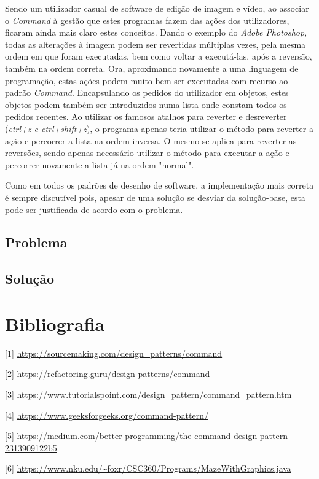 \documentclass[10pt,portuguese]{article}
\begin{document}
\par Sendo um utilizador casual de software de edição de imagem e vídeo, ao associar o \textit{Command} à gestão que estes programas fazem das ações dos utilizadores, ficaram ainda mais claro estes conceitos. Dando o exemplo do \textit{Adobe Photoshop}, todas as alterações à imagem podem ser revertidas múltiplas vezes, pela mesma ordem em que foram executadas, bem como voltar a executá-las, após a reversão, também na ordem correta. 
Ora, aproximando novamente a uma linguagem de programação, estas ações podem muito bem ser executadas com recurso ao padrão \textit{Command}. Encapsulando os pedidos do utilizador em objetos, estes objetos podem também ser introduzidos numa lista onde constam todos os pedidos recentes. 
Ao utilizar os famosos atalhos para reverter e desreverter (\textit{ctrl+z e ctrl+shift+z}), o programa apenas teria utilizar o método para reverter a ação e percorrer a lista na ordem inversa. O mesmo se aplica para reverter as reversões, sendo apenas necessário utilizar o método para executar a ação e percorrer novamente a lista já na ordem "normal".





\par Como em todos os padrões de desenho de software, a implementação mais correta é sempre discutível pois, apesar de uma solução se desviar da solução-base, esta pode ser justificada de acordo com o problema.

\subsection{Problema}
\subsection{Solução}


\clearpage

\section{Bibliografia}





\vspace{5mm} %

[1] \url{https://sourcemaking.com/design_patterns/command}

[2] \url{https://refactoring.guru/design-patterns/command}

[3] \url{https://www.tutorialspoint.com/design_pattern/command_pattern.htm}

[4] \url{https://www.geeksforgeeks.org/command-pattern/}

[5] \url{https://medium.com/better-programming/the-command-design-pattern-2313909122b5}

[6] \url{https://www.nku.edu/~foxr/CSC360/Programs/MazeWithGraphics.java}
\end{document}
